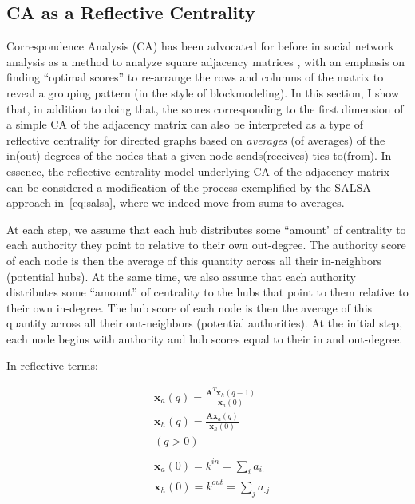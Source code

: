 \documentclass[a4paper,fleqn]{cas-sc}
\begin{document}
\subsection{CA as a Reflective Centrality}
Correspondence Analysis (CA) has been advocated for before in social network analysis as a method to analyze square adjacency matrices \citep{noma_smith85}, with an emphasis on finding ``optimal scores'' to re-arrange the rows and columns of the matrix to reveal a grouping pattern (in the style of blockmodeling). In this section, I show that, in addition to doing that, the scores corresponding to the first dimension of a simple CA of the adjacency matrix can also be interpreted as a type of reflective centrality for directed graphs based on \textit{averages} (of averages) of the in(out) degrees of the nodes that a given node sends(receives) ties to(from). In essence, the reflective centrality model underlying CA of the adjacency matrix can be considered a modification of the process exemplified by the SALSA approach in~\ref{eq:salsa}, where we indeed move from sums to averages.

At each step, we assume that each hub distributes some ``amount' of centrality to each authority they point to relative to their own out-degree. The authority score of each node is then the average of this quantity across all their in-neighbors (potential hubs). At the same time, we also assume that each authority distributes some ``amount'' of centrality to the hubs that point to them relative to their own in-degree. The hub score of each node is then the average of this quantity across all their out-neighbors (potential authorities). At the initial step, each node begins with authority and hub scores equal to their in and out-degree.  

In reflective terms:

\begin{equation}
    \begin{split}
        &\mathbf{x}_a(q) = \frac{\mathbf{A}^T\mathbf{x}_h(q-1)}{\mathbf{x}_a(0)}  \\
        &\mathbf{x}_h(q) = \frac{\mathbf{A}\mathbf{x}_a(q)}{\mathbf{x}_h(0)}  \\ 
        & (q > 0) \\ \\
        &\mathbf{x}_a(0) = k^{in} = \sum_i a_{i.} \\
        &\mathbf{x}_h(0) = k^{out} = \sum_j a_{.j}     
    \end{split}
    \label{eq:ca1}
\end{equation}
\end{document}
